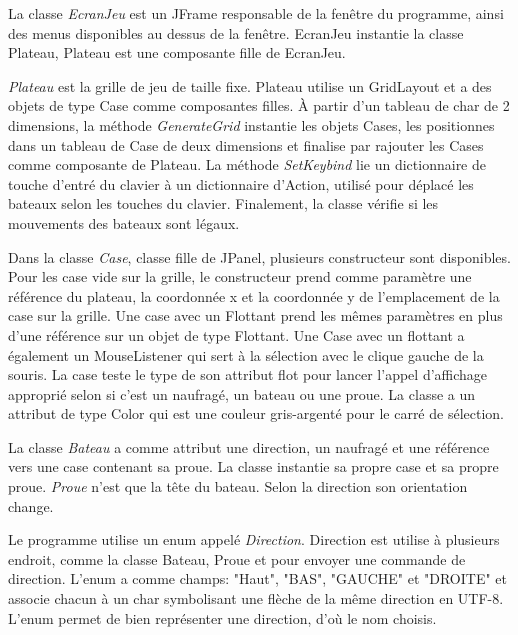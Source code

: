 \documentclass[11pt, french]{article} %
\begin{document}
La classe \textit{EcranJeu} est un JFrame responsable de la fenêtre du programme, ainsi des menus disponibles au dessus de la fenêtre. EcranJeu instantie la classe Plateau, Plateau est une composante fille de EcranJeu. 
\newline

\textit{Plateau} est la grille de jeu de taille fixe. Plateau utilise un GridLayout et a des objets de type Case comme composantes filles. À partir d'un tableau de char de 2 dimensions, la méthode \textit{GenerateGrid} instantie les objets Cases, les positionnes dans un tableau de Case de deux dimensions et finalise par rajouter les Cases comme composante de Plateau. La méthode \textit{SetKeybind} lie un dictionnaire de touche d'entré du clavier à un dictionnaire d'Action, utilisé pour déplacé les bateaux selon les touches du clavier. Finalement, la classe vérifie si les mouvements des bateaux sont légaux.
\newline

Dans la classe \textit{Case}, classe fille de JPanel, plusieurs constructeur sont disponibles. Pour les case vide sur la grille, le constructeur prend comme paramètre une référence du plateau, la coordonnée x et la coordonnée y de l'emplacement de la case sur la grille. Une case avec un Flottant prend les mêmes paramètres en plus d'une référence sur un objet de type Flottant. Une Case avec un flottant a également un MouseListener qui sert à la sélection avec le clique gauche de la souris. La case teste le type de son attribut flot pour lancer l'appel d'affichage approprié selon si c'est un naufragé, un bateau ou une proue. La classe a un attribut de type Color qui est une couleur gris-argenté pour le carré de sélection.
\newline

La classe \textit{Bateau} a comme attribut une direction, un naufragé et une référence vers une case contenant sa proue. La classe instantie sa propre case et sa propre proue. \textit{Proue} n'est que la tête du bateau. Selon la direction son orientation change.
\newline

Le programme utilise un enum appelé \textit{Direction}. Direction est utilise à plusieurs endroit, comme la classe Bateau, Proue et pour envoyer une commande de direction. L'enum a comme champs: "Haut", "BAS", "GAUCHE" et "DROITE" et associe chacun à un char symbolisant une flèche de la même direction en UTF-8. L'enum permet de bien représenter une direction, d'où le nom choisis.
\end{document}
